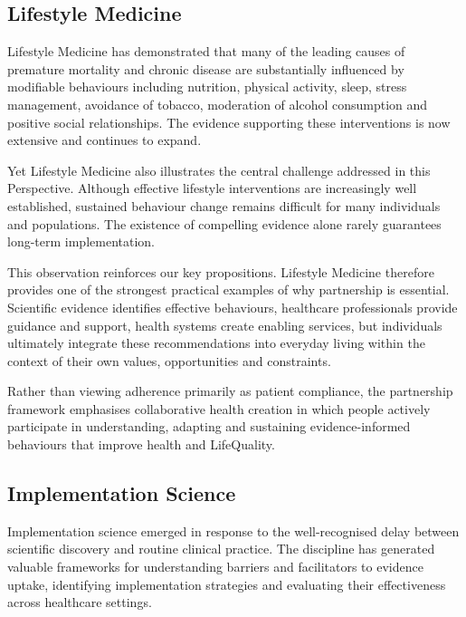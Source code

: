 \documentclass{article}
\begin{document}
\subsection{Lifestyle Medicine}
\label{sec:orge5308de}

Lifestyle Medicine has demonstrated that many of the leading causes of premature mortality and chronic disease are substantially influenced by modifiable behaviours \cite{Katz2009} \cite{Egger2017} including nutrition, physical activity, sleep, stress management, avoidance of tobacco, moderation of alcohol consumption and positive social relationships. The evidence \cite{GBD2021} \cite{WHO2025} supporting these interventions is now extensive and continues to expand.

Yet Lifestyle Medicine also illustrates the central challenge addressed in this Perspective. Although effective lifestyle interventions are increasingly well established, sustained behaviour change  \cite{Michie2011} \cite{Bandura2004} remains difficult for many individuals and populations. The existence of compelling evidence alone rarely guarantees long-term implementation.

This observation reinforces our key propositions. Lifestyle Medicine therefore provides one of the strongest practical examples of why partnership is essential. Scientific evidence identifies effective behaviours, healthcare professionals provide guidance and support, health systems create enabling services, but individuals ultimately integrate these recommendations into everyday living within the context of their own values, opportunities and constraints.

Rather than viewing adherence primarily as patient compliance, the partnership framework emphasises collaborative health creation in which people actively participate in understanding, adapting and sustaining evidence-informed behaviours that improve health and LifeQuality.
\subsection{Implementation Science}
\label{sec:orge124138}

Implementation science emerged in response to the well-recognised delay between scientific discovery and routine clinical practice. \cite{Eccles2006} \cite{Nilsen2015} \cite{Straus2013} The discipline has generated valuable frameworks for understanding barriers and facilitators to evidence uptake, identifying implementation strategies and evaluating their effectiveness \cite{Glasgow2019} across healthcare settings.
\end{document}
